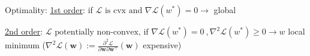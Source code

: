
Optimality: 
\underline{1st order}: 
if $\mathcal{L} \text{ is cvx and } \nabla \mathcal{L}(w^*)=0\rightarrow$ global

\underline{2nd order}:
$\mathcal{L} \text{ potentially non-convex, if } \nabla \mathcal{L}(w^*)=0 \ , \nabla^2 \mathcal{L}(w^*) \geq 0\rightarrow w$ local minimum ($\nabla^{2} \mathcal{L}(\mathbf{w}):=\frac{\partial^{2} \mathcal{L}}{\partial \mathbf{w} \partial \mathbf{w}^{\top}}(\mathbf{w})$ expensive)









